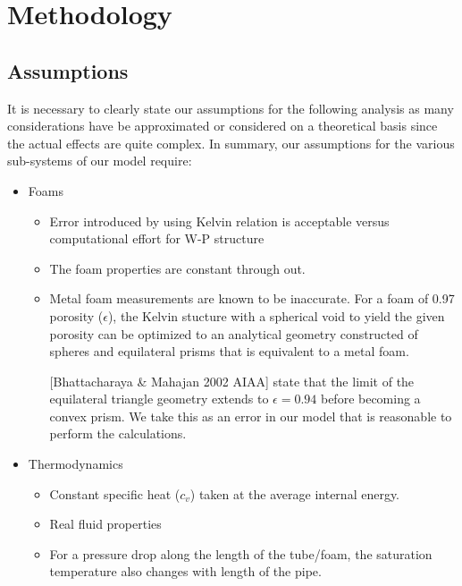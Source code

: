 \documentclass[compileTAMUreport.tex]{subfiles}
\begin{document}
\section{Methodology}

\subsection{Assumptions}

It is necessary to clearly state our assumptions for the following analysis as many considerations have be approximated or considered on a theoretical basis since the actual effects are quite complex. 
In summary, our assumptions for the various sub-systems of our model require:
\begin{itemize} %
	\item Foams
		\begin{itemize}
			\item 	Error introduced by using Kelvin relation is acceptable versus computational effort for W-P structure
			\item The foam properties are constant through out.
			\item	Metal foam measurements are known to be inaccurate. 
			For a foam of 0.97 porosity ($\epsilon$), the Kelvin stucture with a spherical void to yield the given porosity can be optimized to an analytical geometry constructed of spheres and equilateral prisms that is equivalent to a metal foam.
			 
			[Bhattacharaya 		\& Mahajan 2002 AIAA] state that the limit of the equilateral triangle geometry extends to $\epsilon = 0.94$ before becoming a convex prism. 
			We take this as an error in our model that is reasonable to perform the calculations.
		\end{itemize}

	\item Thermodynamics
		\begin{itemize}
			\item	Constant specific heat ($c_v$) taken at the average internal energy.
			\item 	Real fluid properties
			\item 	For a pressure drop along the length of the tube/foam, the saturation temperature also changes with length of the pipe.
		\end{itemize}


\end{itemize}
\end{document}
